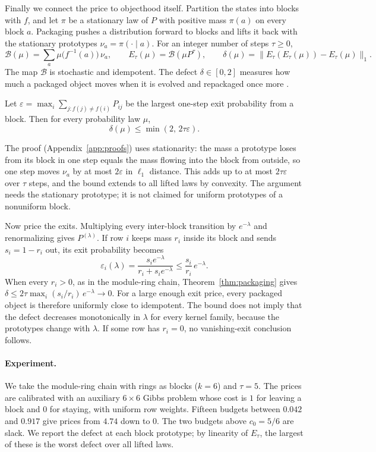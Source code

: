 Finally we connect the price to objecthood itself. Partition the states into blocks with \(f\), and let \(\pi\) be a stationary law of \(P\) with positive mass \(\pi(a)\) on every block \(a\). Packaging pushes a distribution forward to blocks and lifts it back with the stationary prototypes \(\nu_a=\pi(\cdot\mid a)\). For an integer number of steps \(\tau\ge0\),
\[
\mathcal B(\mu)=\sum_a\mu\big(f^{-1}(a)\big)\,\nu_a,\qquad
E_\tau(\mu)=\mathcal B(\mu P^\tau),\qquad
\delta(\mu)=\big\|E_\tau(E_\tau(\mu))-E_\tau(\mu)\big\|_1 .
\]
The map \(\mathcal B\) is stochastic and idempotent. The defect \(\delta\in[0,2]\) measures how much a packaged object moves when it is evolved and repackaged once more \cite{tsiokos2026sixbirds}.

\begin{theorem}\label{thm:packaging}
Let \(\varepsilon=\max_i\sum_{j:f(j)\ne f(i)}P_{ij}\) be the largest one-step exit probability from a block. Then for every probability law \(\mu\),
\[
\delta(\mu)\le\min(2,\,2\tau\varepsilon).
\]
\end{theorem}

The proof (Appendix~\ref{app:proofs}) uses stationarity: the mass a prototype loses from its block in one step equals the mass flowing into the block from outside, so one step moves \(\nu_a\) by at most \(2\varepsilon\) in \(\ell_1\) distance. This adds up to at most \(2\tau\varepsilon\) over \(\tau\) steps, and the bound extends to all lifted laws by convexity. The argument needs the stationary prototype; it is not claimed for uniform prototypes of a nonuniform block.

Now price the exits. Multiplying every inter-block transition by \(e^{-\lambda}\) and renormalizing gives \(P^{(\lambda)}\). If row \(i\) keeps mass \(r_i\) inside its block and sends \(s_i=1-r_i\) out, its exit probability becomes
\[
\varepsilon_i(\lambda)=\frac{s_i e^{-\lambda}}{r_i+s_ie^{-\lambda}}\le\frac{s_i}{r_i}\,e^{-\lambda}.
\]
When every \(r_i>0\), as in the module-ring chain, Theorem~\ref{thm:packaging} gives \(\delta\le2\tau\max_i(s_i/r_i)\,e^{-\lambda}\to0\). For a large enough exit price, every packaged object is therefore uniformly close to idempotent. The bound does not imply that the defect decreases monotonically in \(\lambda\) for every kernel family, because the prototypes change with \(\lambda\). If some row has \(r_i=0\), no vanishing-exit conclusion follows.

\paragraph{Experiment.} We take the module-ring chain with rings as blocks (\(k=6\)) and \(\tau=5\). The prices are calibrated with an auxiliary \(6\times6\) Gibbs problem whose cost is \(1\) for leaving a block and \(0\) for staying, with uniform row weights. Fifteen budgets between \(0.042\) and \(0.917\) give prices from \(4.74\) down to \(0\). The two budgets above \(c_0=5/6\) are slack. We report the defect at each block prototype; by linearity of \(E_\tau\), the largest of these is the worst defect over all lifted laws.

